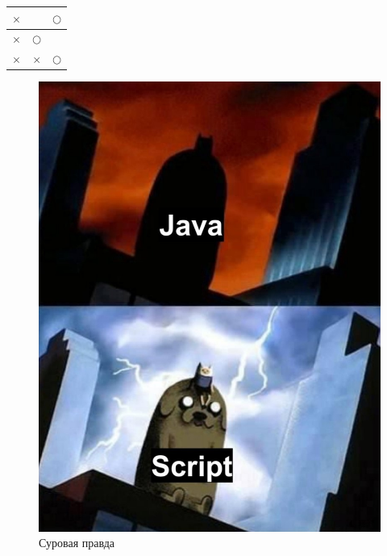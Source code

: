\documentclass[a4paper, 12pt]{article}
\begin{document}
\graphicspath{{images/}{images2/}} %

\date{27.02.21}
\author{А.Н.Золкин}
\bmstutitlelab

\newpage
\begin{center}
  \begin{tabular}{|l|r|c|}
    \hline
    $\times$ &            & $\bigcirc$ \\
    \hline
    $\times$ & $\bigcirc$ &            \\
    \hline
    $\times$ & $\times$   & $\bigcirc$ \\
    \hline
  \end{tabular}
\end{center}
\newpage
\begin{figure}[t]
  \centering
  \includegraphics[scale=0.18]{image_1}
  \caption{Суровая правда}
\end{figure}
\end{document}

